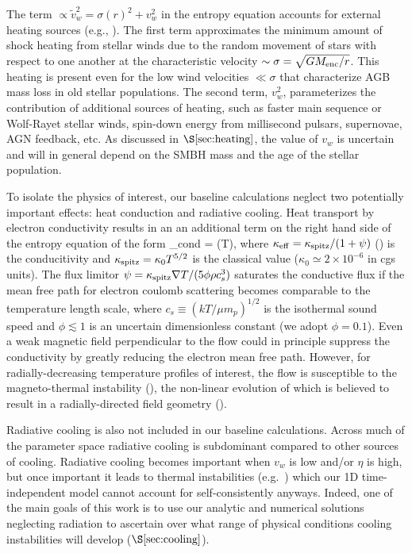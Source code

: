 \documentclass[usenatbib,fleqn]{mn2e}
\newcommand{\vw}{\tilde{v}_{w}}
\newcommand{\vwO}{v_{w}}
\begin{document}
The term $\propto \vw^2 = \sigma(r)^2+v_{w}^2$ in the entropy
equation accounts for external heating sources (e.g.,
\citealt{ShcherbakovWong+:2014a}).  The first term approximates the
minimum amount of shock heating from stellar winds due to the random movement
of stars with respect to one another at the characteristic velocity
$\sim \sigma = \sqrt{GM_{\rm enc}/r}$.  This heating is present even for the low
wind velocities $\ll \sigma$ that characterize AGB mass loss in old
stellar populations.  The second term, $v_{w}^{2}$, parameterizes
the contribution of additional sources of heating, such as faster main
sequence or Wolf-Rayet stellar winds, spin-down energy from millisecond pulsars, supernovae, AGN
feedback, etc.  As discussed in $\S\ref{sec:heating}$, the value of
$v_{w}$ is uncertain and will in general depend on the SMBH mass and
the age of the stellar population.

To isolate the physics of interest, our baseline calculations neglect two potentially important effects: heat conduction and radiative cooling.  Heat transport by electron conductivity results in an an additional term on the right hand side of the entropy equation of the form  
\be {}_{\rm cond} = \nabla\cdot(\kappa \nabla T), \ee
where $\kappa_{\rm
  eff}=\kappa_{\rm spitz}/(1+\psi)$ (\citealt{DaltonBalbus:1993a}) is
the conducitivity and $\kappa_{\rm spitz} = \kappa_0 T^{5/2}$ is the
classical \citet{Spitzer62} value ($\kappa_0\simeq 2\times 10^{-6}$ in
cgs units).  The flux limitor $\psi = \kappa_{\rm spitz} \nabla
T/(5\phi \rho c_s^3)$ saturates the conductive flux if the mean free
path for electron coulomb scattering becomes comparable to the
temperature length scale, where $c_s \equiv (kT/\mu m_p)^{1/2}$ is the
isothermal sound speed and $\phi \lesssim 1$ is an uncertain
dimensionless constant (we adopt $\phi = 0.1$).  Even a weak magnetic
field perpendicular to the flow could in principle suppress the
conductivity by greatly reducing the electron mean free path.  However, for radially-decreasing temperature profiles
of interest, the flow is susceptible to the magneto-thermal instability (\citealt{Balbus01}), the non-linear evolution of which is believed to result in a radially-directed field geometry (\citealt{Parrish&Stone07}).

Radiative cooling is also not included in our baseline calculations.  Across much of the parameter space radiative cooling is subdominant compared to other sources of cooling.  Radiative cooling becomes important when $\vwO$ is low and/or $\eta$ is high, but once important it leads to thermal instabilities (e.g.~\citealt{McCourt+12}) which our 1D
time-independent model cannot account for self-consistently anyways.  Indeed, one of the main goals of this work is to use our analytic and numerical solutions neglecting radiation to ascertain over what range of physical conditions cooling instabilities will develop ($\S\ref{sec:cooling}$).
\end{document}
